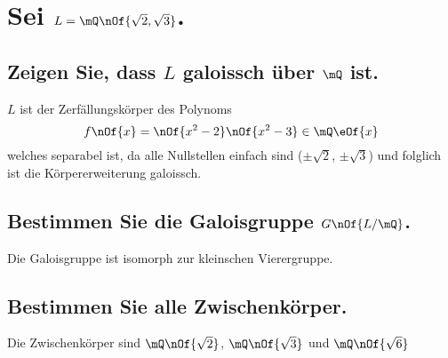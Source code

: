 \section{Sei $L = \mQ\nOf{\sqrt{2},\sqrt{3}}$.}
\subsection{Zeigen Sie, dass $L$ galoissch über $\mQ$ ist.}
$L$ ist der Zerfällungskörper des Polynoms
\begin{equation}
	f\nOf{x} = \nOf{x^2-2}\nOf{x^2-3} \in \mQ\eOf{x}
\end{equation}
welches separabel ist, da alle Nullstellen einfach sind ($\pm\sqrt{2}$, $\pm\sqrt{3}$) und folglich ist die Körpererweiterung galoissch.


\subsection{Bestimmen Sie die Galoisgruppe $G\nOf{L/\mQ}$.}
Die Galoisgruppe ist isomorph zur kleinschen Vierergruppe.


\subsection{Bestimmen Sie alle Zwischenkörper.}
Die Zwischenkörper sind $\mQ\nOf{\sqrt{2}}$, $\mQ\nOf{\sqrt{3}}$ und $\mQ\nOf{\sqrt{6}}$